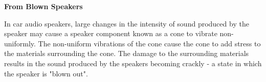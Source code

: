 \documentclass[addpoints]{examsetup}\usepackage[]{graphicx}\usepackage[]{color}
\begin{document}
\begin{questions}
\pagebreak


\question \textbf{From Blown Speakers}



In car audio speakers, large changes in the intensity of sound produced by the speaker may cause a speaker component known as a cone to vibrate non-uniformly. 
The non-uniform vibrations of the cone cause the cone to add stress to the materials surrounding the cone. 
The damage to the surrounding materials results in the sound produced by the speakers becoming crackly - a state in which the speaker is "blown out".


\end{questions}
\end{document}
